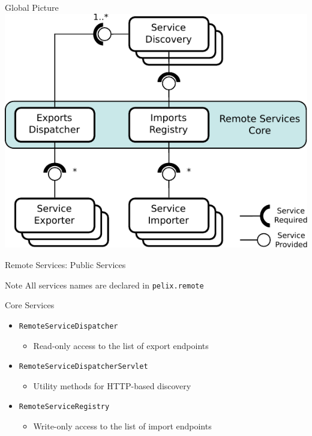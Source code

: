 \begin{frame}{Global Picture}
\centering
\includegraphics[height=.8\textheight]{../imgs/rs_arch}
\end{frame}

\begin{frame}{Remote Services: Public Services}
\begin{small}
\begin{exampleblock}{Note}
All services names are declared in \texttt{pelix.remote}
\end{exampleblock}

\begin{block}{Core Services}
\begin{itemize}
\item[] \texttt{RemoteServiceDispatcher}
\begin{itemize}
\vspace{-.5em}
\item[] Read-only access to the list of export endpoints
\end{itemize}
\item[] \texttt{RemoteServiceDispatcherServlet}
\begin{itemize}
\vspace{-.5em}
\item[] Utility methods for HTTP-based discovery
\end{itemize}
\item[] \texttt{RemoteServiceRegistry}
\begin{itemize}
\vspace{-.5em}
\item[] Write-only access to the list of import endpoints
\end{itemize}
\end{itemize}
\end{block}
\end{small}
\end{frame}

